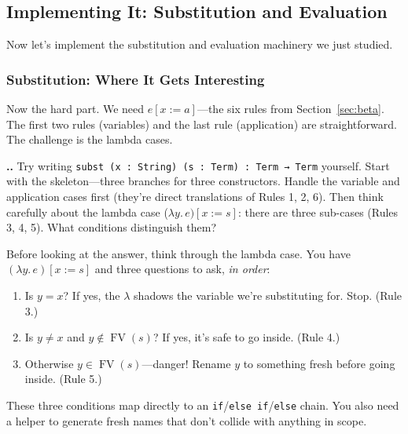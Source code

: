 \documentclass[11pt,a4paper]{article}
\newcounter{exercise}[section]
\renewcommand{\theexercise}{\thesection.\arabic{exercise}}
\theoremstyle{definition}
\newcommand{\lam}{\lambda}
\newcommand{\FV}{\operatorname{FV}}
\begin{document}

\subsection{Implementing It: Substitution and Evaluation}\label{sec:impl-subst}

Now let's implement the substitution and evaluation machinery we just studied.

\subsubsection{Substitution: Where It Gets Interesting}

Now the hard part. We need $e[x := a]$---the six rules from
Section~\ref{sec:beta}. The first two rules (variables) and the last rule
(application) are straightforward. The challenge is the lambda cases.

\begin{exercisebox}
\textbf{\theexercise.}\; Try writing \texttt{subst (x : String) (s : Term) : Term → Term} yourself. Start with the skeleton---three branches for three constructors. Handle the variable and application cases first (they're direct translations of Rules 1, 2, 6). Then think carefully about the lambda case ($\lam y.\, e)[x := s]$: there are three sub-cases (Rules 3, 4, 5). What conditions distinguish them?
\end{exercisebox}

Before looking at the answer, think through the lambda case. You have
$(\lam y.\, e)[x := s]$ and three questions to ask, \emph{in order}:

\begin{enumerate}[leftmargin=2em]
\item Is $y = x$? If yes, the $\lam$ shadows the variable we're substituting
  for. Stop. (Rule 3.)
\item Is $y \neq x$ and $y \notin \FV(s)$? If yes, it's safe to go inside.
  (Rule 4.)
\item Otherwise $y \in \FV(s)$---danger! Rename $y$ to something fresh before
  going inside. (Rule 5.)
\end{enumerate}

These three conditions map directly to an \texttt{if}/\texttt{else if}/\texttt{else} chain. You also need a helper to generate fresh names
that don't collide with anything in scope.
\end{document}
